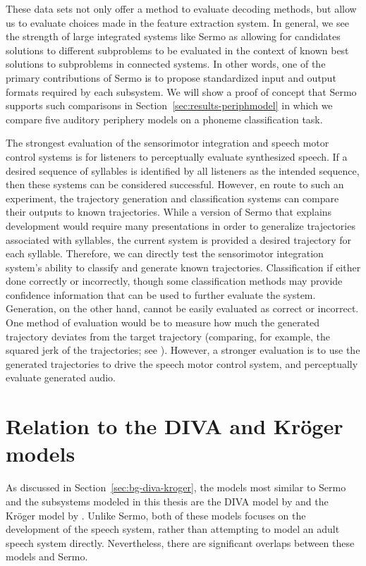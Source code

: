 These data sets not only offer a method
to evaluate decoding methods,
but allow us to evaluate choices made
in the feature extraction system.
In general, we see the strength
of large integrated systems like Sermo
as allowing for candidates solutions
to different subproblems
to be evaluated in the context of
known best solutions
to subproblems in connected systems.
In other words,
one of the primary contributions of Sermo
is to propose standardized input and output formats
required by each subsystem.
We will show a proof of concept
that Sermo supports such comparisons
in Section~\ref{sec:results-periphmodel}
in which we compare
five auditory periphery models
on a phoneme classification task.

The strongest evaluation
of the sensorimotor integration
and speech motor control systems
is for listeners to perceptually evaluate
synthesized speech.
If a desired sequence of syllables
is identified by all listeners
as the intended sequence,
then these systems can be considered successful.
However, en route to such an experiment,
the trajectory generation and classification systems
can compare their outputs to known trajectories.
While a version of Sermo
that explains development
would require many presentations
in order to generalize trajectories
associated with syllables,
the current system
is provided a desired trajectory
for each syllable.
Therefore, we can directly
test the sensorimotor integration system's
ability to classify
and generate known trajectories.
Classification if either done
correctly or incorrectly,
though some classification methods
may provide confidence information
that can be used to further evaluate the system.
Generation, on the other hand,
cannot be easily evaluated
as correct or incorrect.
One method of evaluation would be to
measure how much the generated trajectory
deviates from the target trajectory
(comparing, for example,
the squared jerk of the trajectories;
see \citealt{hogan2009}).
However, a stronger evaluation
is to use the generated trajectories
to drive the speech motor control system,
and perceptually evaluate generated audio.

\section{Relation to the DIVA and Kr\"{o}ger models}

As discussed in Section~\ref{sec:bg-diva-kroger},
the models most similar to Sermo
and the subsystems modeled in this thesis
are the DIVA model by \citeauthor{guenther1995}
and the Kr\"{o}ger model by \citeauthor{kroger2009}.
Unlike Sermo, both of these models
focuses on the development of the speech system,
rather than attempting to model
an adult speech system directly.
Nevertheless, there are significant overlaps
between these models and Sermo.

